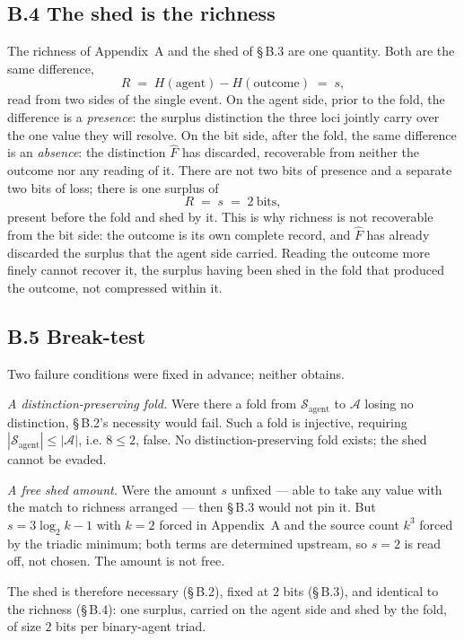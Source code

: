 \documentclass[11pt,oneside]{report}
\theoremstyle{definition}
\theoremstyle{remark}
\begin{document}
\subsection*{B.4 The shed is the richness}
The richness of Appendix~A and the shed of \S\,B.3 are one quantity. Both are the same difference,
\[
  R \;=\; H(\text{agent}) - H(\text{outcome}) \;=\; s,
\]
read from two sides of the single event. On the agent side, prior to the fold, the difference is a
\emph{presence}: the surplus distinction the three loci jointly carry over the one value they will
resolve. On the bit side, after the fold, the same difference is an \emph{absence}: the distinction
\ensuremath{\hat{F}} has discarded, recoverable from neither the outcome nor any reading of it. There
are not two bits of presence and a separate two bits of loss; there is one surplus of
\[
  R \;=\; s \;=\; 2 \ \text{bits},
\]
present before the fold and shed by it. This is why richness is not recoverable from the bit side:
the outcome is its own complete record, and \ensuremath{\hat{F}} has already discarded the surplus
that the agent side carried. Reading the outcome more finely cannot recover it, the surplus having
been shed in the fold that produced the outcome, not compressed within it.

\subsection*{B.5 Break-test}
Two failure conditions were fixed in advance; neither obtains.

\emph{A distinction-preserving fold.} Were there a fold from \ensuremath{\mathcal{S}_{\text{agent}}}
to \ensuremath{\mathcal{A}} losing no distinction, \S\,B.2's necessity would fail. Such a fold is
injective, requiring \ensuremath{|\mathcal{S}_{\text{agent}}| \leq |\mathcal{A}|}, i.e.
\ensuremath{8 \leq 2}, false. No distinction-preserving fold exists; the shed cannot be evaded.

\emph{A free shed amount.} Were the amount \ensuremath{s} unfixed --- able to take any value with the
match to richness arranged --- then \S\,B.3 would not pin it. But \ensuremath{s = 3\log_2 k - 1} with
\ensuremath{k = 2} forced in Appendix~A and the source count \ensuremath{k^{3}} forced by the triadic
minimum; both terms are determined upstream, so \ensuremath{s = 2} is read off, not chosen. The
amount is not free.

The shed is therefore necessary (\S\,B.2), fixed at \ensuremath{2} bits (\S\,B.3), and identical to
the richness (\S\,B.4): one surplus, carried on the agent side and shed by the fold, of size
\ensuremath{2} bits per binary-agent triad.
\end{document}
